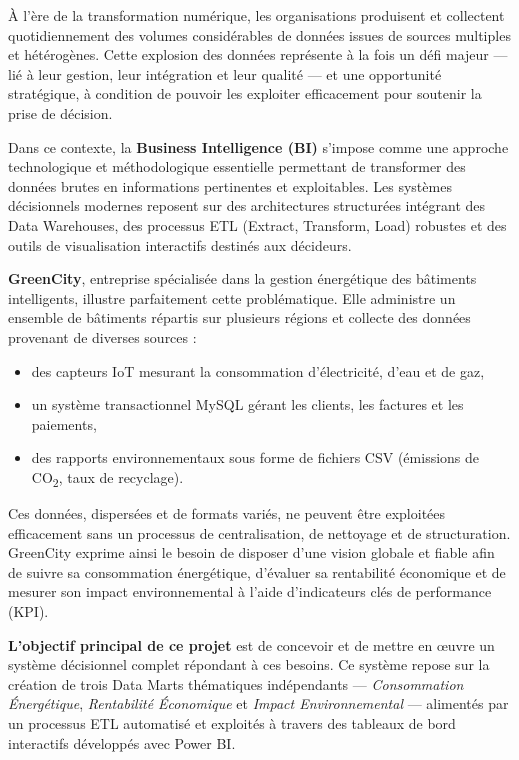 \documentclass[12pt,a4paper]{report}
\begin{document}
À l’ère de la transformation numérique, les organisations produisent et collectent quotidiennement des volumes considérables de données issues de sources multiples et hétérogènes. Cette explosion des données représente à la fois un défi majeur — lié à leur gestion, leur intégration et leur qualité — et une opportunité stratégique, à condition de pouvoir les exploiter efficacement pour soutenir la prise de décision.

Dans ce contexte, la \textbf{Business Intelligence (BI)} s’impose comme une approche technologique et méthodologique essentielle permettant de transformer des données brutes en informations pertinentes et exploitables. Les systèmes décisionnels modernes reposent sur des architectures structurées intégrant des Data Warehouses, des processus ETL (Extract, Transform, Load) robustes et des outils de visualisation interactifs destinés aux décideurs.

\textbf{GreenCity}, entreprise spécialisée dans la gestion énergétique des bâtiments intelligents, illustre parfaitement cette problématique. Elle administre un ensemble de bâtiments répartis sur plusieurs régions et collecte des données provenant de diverses sources :
\begin{itemize}
    \item des capteurs IoT mesurant la consommation d’électricité, d’eau et de gaz,
    \item un système transactionnel MySQL gérant les clients, les factures et les paiements,
    \item des rapports environnementaux sous forme de fichiers CSV (émissions de CO\textsubscript{2}, taux de recyclage).
\end{itemize}

Ces données, dispersées et de formats variés, ne peuvent être exploitées efficacement sans un processus de centralisation, de nettoyage et de structuration. GreenCity exprime ainsi le besoin de disposer d’une vision globale et fiable afin de suivre sa consommation énergétique, d’évaluer sa rentabilité économique et de mesurer son impact environnemental à l’aide d’indicateurs clés de performance (KPI).

\textbf{L’objectif principal de ce projet} est de concevoir et de mettre en œuvre un système décisionnel complet répondant à ces besoins. Ce système repose sur la création de trois Data Marts thématiques indépendants — \textit{Consommation Énergétique}, \textit{Rentabilité Économique} et \textit{Impact Environnemental} — alimentés par un processus ETL automatisé et exploités à travers des tableaux de bord interactifs développés avec Power BI.
\end{document}
